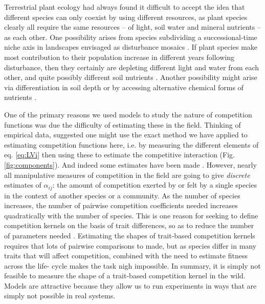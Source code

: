 \documentclass[a4paper,11pt]{article}
\begin{document}
Terrestrial plant ecology had always found it difficult to accept the
idea that different species can only coexist by using different
resources, as plant species clearly all require the same resources -- of
light, soil water and mineral nutrients -- as each other. One possibility
arises from species subdividing a successional-time niche axis in
landscapes envisaged as disturbance mosaics \citep{Connell-1978}. If
plant species make most contribution to their population increase in
different years following disturbance, then they certainly are
depleting different light and water from each other, and quite
possibly different soil nutrients \citep{Moorcroft-2001}. Another
possibility might arise via differentiation in soil depth or by accessing
alternative chemical forms of nutrients \citep{Tilman-1977}.

One of the primary reasons we used models to study the nature of
competition functions was due the difficulty of estimating these in
the field.
Thinking of empirical data, \citet{Ricklefs-1973} suggested one might use
the exact method we have
applied to estimating competition functions here, i.e. by measuring the
different elements of eq. \ref{eq:LVi} then using these to estimate
the competitive interaction (Fig. \ref{fig:components}).
And indeed some estimates have been made \citep{Ricklefs-1973,
  Kraft-2015}.
%
However, nearly all manipulative measures of competition in the field
are going to give \emph{discrete} estimates of $\alpha_{ij}$: the
amount of competition exerted by or felt by a single species in the
context of another species or a community. As the number of species
increases, the number of pairwise competition coefficients needed
increases quadratically with the number of species. This is one reason
for seeking to define competition kernels on the basis of trait
differences, so as to reduce the number of parameters needed
\citep{Kraft-2015}. Estimating the shapes of trait-based competition
kernels requires that lots of pairwise comparisons to made, but as
species differ in many traits that will affect competition, combined
with the need to estimate fitness across the life- cycle makes the
task nigh impossible. In summary, it is simply not feasible to measure the
shape of a trait-based competition kernel in the wild. 
Models are attractive because they allow us to
run experiments in ways that are simply not possible in real systems.
\end{document}
